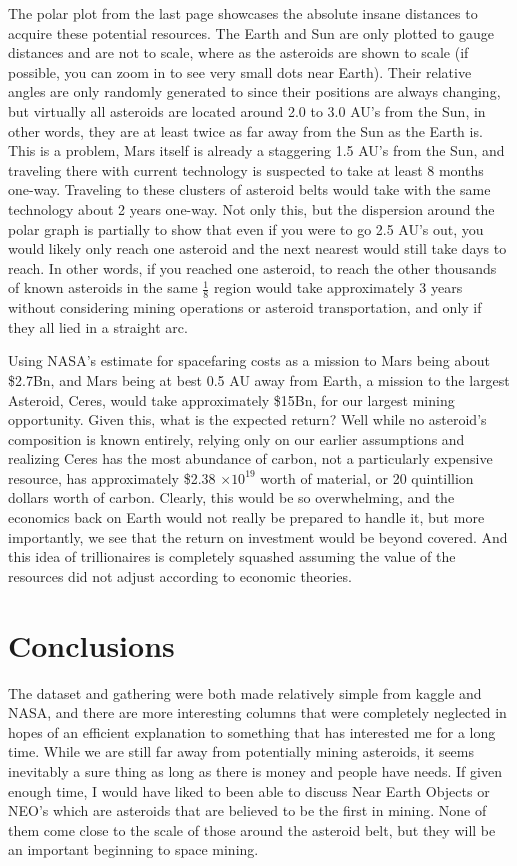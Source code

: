 \documentclass[12pt]{report}
\begin{document}
\;\;\;\; The polar plot from the last page showcases the absolute insane distances to acquire these potential resources. The Earth and Sun are only plotted to gauge distances and are not to scale, where as the asteroids are shown to scale (if possible, you can zoom in to see very small dots near Earth). Their relative angles are only randomly generated to since their positions are always changing, but virtually all asteroids are located around 2.0 to 3.0 AU's from the Sun, in other words, they are at least twice as far away from the Sun as the Earth is. This is a problem, Mars itself is already a staggering 1.5 AU's from the Sun, and traveling there with current technology is suspected to take at least 8 months one-way. Traveling to these clusters of asteroid belts would take with the same technology about 2 years one-way. Not only this, but the dispersion around the polar graph is partially to show that even if you were to go 2.5 AU's out, you would likely only reach one asteroid and the next nearest would still take days to reach. In other words, if you reached one asteroid, to reach the other thousands of known asteroids in the same $\frac{1}{8}$ region would take approximately 3 years without considering mining operations or asteroid transportation, and only if they all lied in a straight arc.

\;\;\;\; Using NASA's estimate for spacefaring costs as a mission to Mars being about \$2.7Bn, and Mars being at best 0.5 AU away from Earth, a mission to the largest Asteroid, Ceres, would take approximately \$15Bn, for our largest mining opportunity. Given this, what is the expected return? Well while no asteroid's composition is known entirely, relying only on our earlier assumptions and realizing Ceres has the most abundance of carbon, not a particularly expensive resource, has approximately \$2.38 $\times 10^{19}$ worth of material, or 20 quintillion dollars worth of carbon. Clearly, this would be so overwhelming, and the economics back on Earth would not really be prepared to handle it, but more importantly, we see that the return on investment would be beyond covered. And this idea of trillionaires is completely squashed assuming the value of the resources did not adjust according to economic theories.
\newpage
\section*{Conclusions}
\;\;\;\; The dataset and gathering were both made relatively simple from kaggle and NASA, and there are more interesting columns that were completely neglected in hopes of an efficient explanation to something that has interested me for a long time. While we are still far away from potentially mining asteroids, it seems inevitably a sure thing as long as there is money and people have needs. If given enough time, I would have liked to been able to discuss Near Earth Objects or NEO's which are asteroids that are believed to be the first in mining. None of them come close to the scale of those around the asteroid belt, but they will be an important beginning to space mining. 
\end{document}
